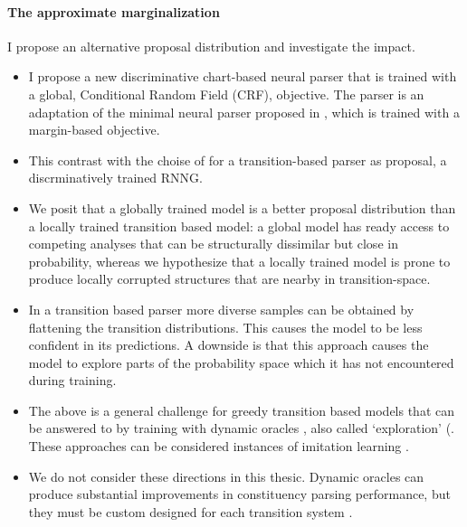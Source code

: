 \paragraph{The approximate marginalization} I propose an alternative proposal distribution and investigate the impact.
\begin{itemize}
  \item I propose a new discriminative chart-based neural parser that is trained with a global, Conditional Random Field (CRF), objective. The parser is an adaptation of the minimal neural parser proposed in \citet{stern2017minimal}, which is trained with a margin-based objective.
  \item This contrast with the choise of \citet{Dyer+2016:RNNG} for a transition-based parser as proposal, a discrminatively trained RNNG.
  \item We posit that a globally trained model is a better proposal distribution than a locally trained transition based model: a global model has ready access to competing analyses that can be structurally dissimilar but close in probability, whereas we hypothesize that a locally trained model is prone to produce locally corrupted structures that are nearby in transition-space.
  \item In a transition based parser more diverse samples can be obtained by flattening the transition distributions. This causes the model to be less confident in its predictions. A downside is that this approach causes the model to explore parts of the probability space which it has not encountered during training.
  \item The above is a general challenge for greedy transition based models that can be answered to by training with dynamic oracles \citep{Goldberg+2013:dynamic}, also called `exploration' (\citep{Ballesteros+2016:exploration,stern2017minimal}. These approaches can be considered instances of imitation learning \citep{Vlachos2012:imitation,Eisner+2012:imitation}.
  \item We do not consider these directions in this thesic. Dynamic oracles can produce substantial improvements in constituency parsing performance, but they must be custom designed for each transition system \citep{Klein+2018:reinforce}.
\end{itemize}



